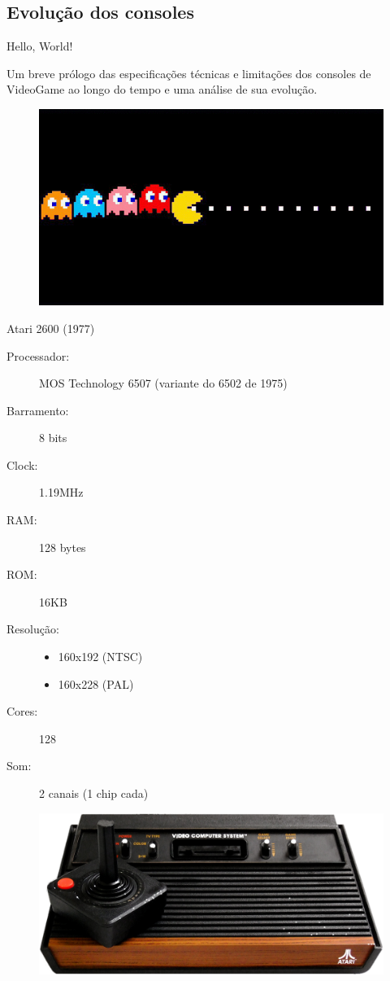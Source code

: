 \documentclass{beamer}
\begin{document}
\begin{darkframes}
    \subsection{Evolução dos consoles}
    \begin{frame}{Hello, World!}
        \begin{multicols}{2}
            Um breve prólogo das especificações técnicas e limitações dos consoles de
            VideoGame ao longo do tempo e uma análise de sua evolução.
            \begin{figure}[h!]
                \centering
                \includegraphics[width=.5\textwidth]{pacman}
            \end{figure}
        \end{multicols}
    \end{frame}

    \begin{frame}{Atari 2600 (1977)}
        \begin{multicols}{2}
            \begin{description}
                \item[Processador:] MOS Technology 6507 (variante do 6502 de 1975)
                \item[Barramento:] 8 bits
                \item[Clock:] 1.19MHz
                \item[RAM:] 128 bytes
                \item[ROM:] 16KB
                \item[Resolução:]
                    \begin{itemize}
                        \item 160x192 (NTSC)
                        \item 160x228 (PAL)
                    \end{itemize}
                \item[Cores:] 128
                \item[Som:] 2 canais (1 chip cada)
            \end{description}
        \end{multicols}
        \begin{figure}[h!]
            \centering
            \includegraphics[width=.5\textwidth]{Atari2600}
        \end{figure}
    \end{frame}


\end{darkframes}
\end{document}
